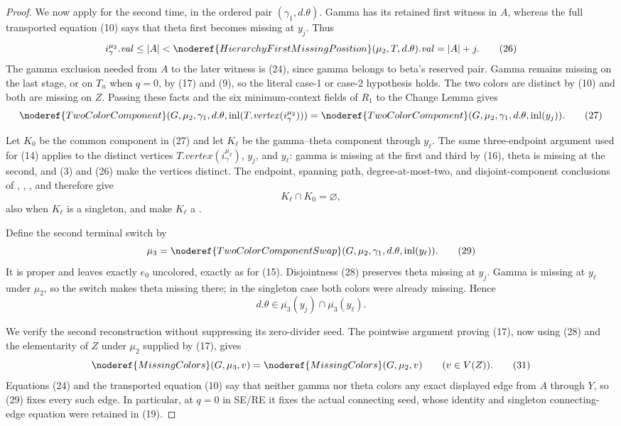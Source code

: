 \begin{proof}
We now apply  for the second time, in the ordered
pair $(\gamma_1,d.\theta)$.  Gamma has its retained first witness in
$A$, whereas the full transported equation (10) says that theta first
becomes missing at $y_j$.  Thus
\[
 i_\gamma^{\mu_2}.\mathit{val}\le |A|
   <\noderef{HierarchyFirstMissingPosition}
       (\mu_2,T,d.\theta).\mathit{val}=|A|+j.                  \tag{26}
\]
The gamma exclusion needed from $A$ to the later witness is (24), since
gamma belongs to beta's reserved pair.  Gamma remains missing on the
last stage, or on $T_n$ when $q=0$, by (17) and (9), so the literal
case-1 or case-2 hypothesis holds.  The two colors are distinct by
(10) and both are missing on $Z$.  Passing these facts and the six
minimum-context fields of $R_1$ to the Change Lemma gives
\[
 \noderef{TwoColorComponent}(G,\mu_2,\gamma_1,d.\theta,
   \operatorname{inl}(T.\mathit{vertex}(i_\gamma^{\mu_2})))
 =
 \noderef{TwoColorComponent}(G,\mu_2,\gamma_1,d.\theta,
   \operatorname{inl}(y_j)).                                  \tag{27}
\]

Let $K_0$ be the common component in (27) and let $K_\ell$ be the
gamma--theta component through $y_\ell$.  The same three-endpoint
argument used for (14) applies to the distinct vertices
$T.\mathit{vertex}(i_\gamma^{\mu_2})$, $y_j$, and $y_\ell$: gamma is
missing at the first and third by (16), theta is missing at the second,
and (3) and (26) make the vertices distinct.  The endpoint, spanning
path, degree-at-most-two, and disjoint-component conclusions of
,
,
, and
 therefore give
\[
                         K_\ell\cap K_0=\varnothing,           \tag{28}
\]
also when $K_\ell$ is a singleton, and make $K_\ell$ a
.

Define the second terminal switch by
\[
 \mu_3=\noderef{TwoColorComponentSwap}
       (G,\mu_2,\gamma_1,d.\theta,\operatorname{inl}(y_\ell)). \tag{29}
\]
It is proper and leaves exactly $e_0$ uncolored, exactly as for (15).
Disjointness (28) preserves theta missing at $y_j$.  Gamma is missing at
$y_\ell$ under $\mu_2$, so the switch makes theta missing there; in the
singleton case both colors were already missing.  Hence
\[
                 d.\theta\in\overline{\mu_3}(y_j)
                      \cap\overline{\mu_3}(y_\ell).           \tag{30}
\]

We verify the second reconstruction without suppressing its zero-divider
seed.  The pointwise argument proving (17), now using (28) and the
elementarity of $Z$ under $\mu_2$ supplied by (17), gives
\[
 \noderef{MissingColors}(G,\mu_3,v)
   =\noderef{MissingColors}(G,\mu_2,v)\qquad(v\in V(Z)).       \tag{31}
\]
Equations (24) and the transported equation (10) say that neither gamma
nor theta colors any exact displayed edge from $A$ through $Y$, so
(29) fixes every such edge.  In particular, at $q=0$ in SE/RE it fixes
the actual connecting seed, whose identity and singleton connecting-edge
equation were retained in (19).


\end{proof}
